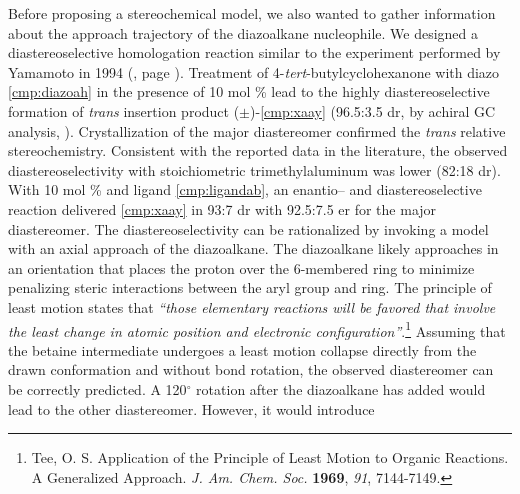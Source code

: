 Before proposing a stereochemical model, we also wanted to gather information about
the approach trajectory of the diazoalkane nucleophile. We designed a diastereoselective
homologation reaction similar to the experiment performed by Yamamoto in 1994
(, page \pageref{sch:yamamotodiastereo}).
Treatment of 4-\textit{tert}-butylcyclohexanone with diazo \ref{cmp:diazoah} in the presence of 10
mol \%  lead to the highly diastereoselective formation of \textit{trans} insertion
product ($\pm$)-\ref{cmp:xaay} (96.5:3.5 dr, by achiral GC analysis,
).
Crystallization of the major diastereomer confirmed the \textit{trans} relative stereochemistry.
Consistent with the reported data in the literature, the observed diastereoselectivity with
stoichiometric trimethylaluminum was lower (82:18 dr). With 10 mol \%
 and ligand \ref{cmp:ligandab}, an enantio-- and diastereoselective reaction delivered
\ref{cmp:xaay} in 93:7 dr with 92.5:7.5 er for the major diastereomer. The diastereoselectivity can
be rationalized by invoking a model with an axial approach of the diazoalkane. The diazoalkane
likely approaches in an orientation that places the proton over the 6-membered ring to minimize
penalizing steric interactions between the aryl group and ring. The principle of least motion
states that \textit{``those elementary reactions will be favored that involve the least change in
atomic position and electronic configuration''}.\footnote{{\frenchspacing Tee, O. S. Application of
the Principle of Least Motion to Organic Reactions. A Generalized Approach. \textit{J. Am. Chem.
Soc.} \textbf{1969}, \textit{91}, 7144-7149.}} Assuming that the betaine intermediate
undergoes a least motion collapse directly from the drawn conformation and without  bond
rotation, the observed diastereomer can be correctly predicted. A 120$^{\circ}$ rotation
after the diazoalkane has added would lead to the other diastereomer. However, it would introduce
